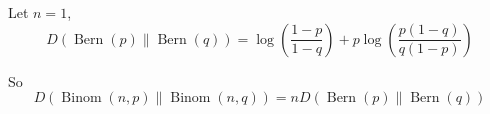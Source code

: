 \documentclass[a4paper]{article}
\begin{document}
\begin{enumerate}
\begin{enumerate}
      Let $n=1$, 
      \begin{equation}
        D(\operatorname{Bern}(p) \| \operatorname{Bern}(q)) = \log \left(\frac {1-p}{1-q}\right) + p \log \left(\frac {p(1-q)}{q(1-p)}\right)
      \end{equation}

      So 
      \begin{equation}
        D(\operatorname{Binom}(n, p) \| \operatorname{Binom}(n, q))=n D(\operatorname{Bern}(p) \| \operatorname{Bern}(q))
      \end{equation}

     \end{enumerate}
    


\end{enumerate}
\end{document}
